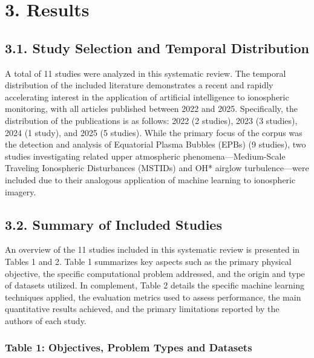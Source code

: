 \hypertarget{results}{%
\section{3. Results}\label{results}}

\hypertarget{study-selection-and-temporal-distribution}{%
\subsection{3.1. Study Selection and Temporal
Distribution}\label{study-selection-and-temporal-distribution}}

A total of 11 studies were analyzed in this systematic review. The
temporal distribution of the included literature demonstrates a recent
and rapidly accelerating interest in the application of artificial
intelligence to ionospheric monitoring, with all articles published
between 2022 and 2025. Specifically, the distribution of the
publications is as follows: 2022 (2 studies), 2023 (3 studies), 2024 (1
study), and 2025 (5 studies). While the primary focus of the corpus was
the detection and analysis of Equatorial Plasma Bubbles (EPBs) (9
studies), two studies investigating related upper atmospheric
phenomena---Medium-Scale Traveling Ionospheric Disturbances (MSTIDs) and
OH* airglow turbulence---were included due to their analogous
application of machine learning to ionospheric imagery.

\hypertarget{summary-of-included-studies}{%
\subsection{3.2. Summary of Included
Studies}\label{summary-of-included-studies}}

An overview of the 11 studies included in this systematic review is
presented in Tables 1 and 2. Table 1 summarizes key aspects such as the
primary physical objective, the specific computational problem
addressed, and the origin and type of datasets utilized. In complement,
Table 2 details the specific machine learning techniques applied, the
evaluation metrics used to assess performance, the main quantitative
results achieved, and the primary limitations reported by the authors of
each study.

\hypertarget{table-1-objectives-problem-types-and-datasets}{%
\subsubsection{Table 1: Objectives, Problem Types and
Datasets}\label{table-1-objectives-problem-types-and-datasets}}

